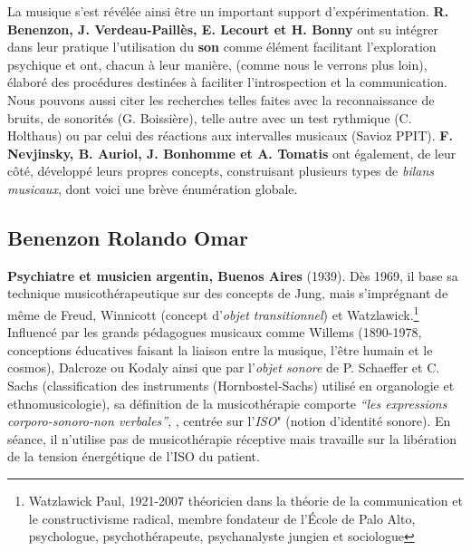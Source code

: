 	 La musique s'est révélée ainsi être un important support
         d'expérimentation.   \textbf{R. Benenzon, J. Verdeau-Paillès, E.
         Lecourt et H. Bonny} ont su intégrer dans leur pratique l'utilisation du\textbf{ son }comme
         élément facilitant l'exploration psychique et
         ont, chacun à leur manière, (comme nous le verrons plus loin), élaboré des procédures destinées à faciliter
         l'introspection et la communication. Nous pouvons aussi citer les recherches telles faites avec la reconnaissance de
bruits, de sonorités (G. Boissière), telle autre avec un test rythmique
(C. Holthaus) ou par celui
des réactions aux intervalles musicaux (Savioz PPIT).
\textbf{F. Nevjinsky, B. Auriol, J. Bonhomme
           et A. Tomatis} ont également, de leur côté, développé leurs propres
           concepts, construisant plusieurs types de \emph{bilans musicaux},
           dont voici une brève énumération globale.


          \subsection{Benenzon Rolando Omar}
	\textbf{ Psychiatre et
    musicien argentin, Buenos Aires} (1939).
	  \label{benenzon}
	  Dès 1969, il base sa technique
	  musicothérapeutique sur des concepts
	  de Jung, mais s'imprégnant de même de Freud, Winnicott \autocite{winnicott}
          (concept d'\textit{objet transitionnel})
          et Watzlawick.\footnote{ Watzlawick Paul, 1921-2007  théoricien dans la théorie de la communication et le constructivisme radical, membre fondateur de l'École de Palo Alto, psychologue, psychothérapeute, psychanalyste jungien et sociologue}
	  Influencé par les grands  pédagogues musicaux comme
          Willems  (1890-1978, conceptions éducatives faisant la liaison
          entre la musique, l'être humain et le cosmos),
          Dalcroze ou Kodaly ainsi que par l'\textit{objet sonore} de
          P. Schaeffer
          et C. Sachs (classification des instruments
          (Hornbostel-Sachs) utilisé en organologie et ethnomusicologie), sa définition de la musicothérapie comporte
	  \emph{\textsl{ ``les expressions corporo-sonoro-non
              verbales''}}, \autocite{benenzon:musicotherapie},
	  centrée sur l'\textit{ISO}" (notion
          d'identité sonore). En séance, il n'utilise pas de
          musicothérapie réceptive mais travaille sur la libération de
          la tension énergétique de l'ISO du patient.


